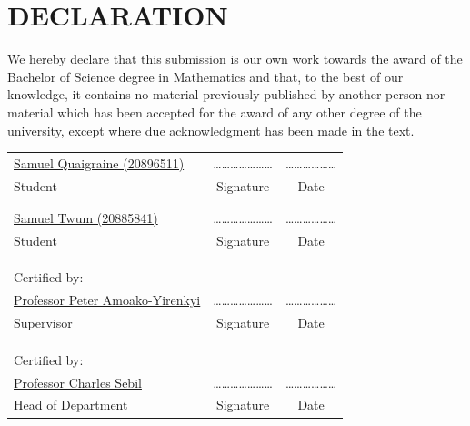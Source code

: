 \chapter*{DECLARATION}

We hereby declare that this submission is our own work towards the award of the Bachelor of Science degree in Mathematics and that, to the best of our knowledge, it contains no material previously published by another person nor material which has been accepted for the award of any other degree of the university, except where due acknowledgment has been made in the text.

\vspace{1.5cm}
\begin{center}
\begin{tabular}{lcc}
\underline{Samuel Quaigraine (20896511)} & \quad\quad\quad \ldots\ldots\ldots\ldots\ldots\ldots\ldots & \quad\quad\quad \ldots\ldots\ldots\ldots\ldots\ldots \\
Student & \quad\quad\quad Signature & \quad\quad\quad Date \\
& & \\
& & \\
\underline{Samuel Twum (20885841)} & \quad\quad\quad \ldots\ldots\ldots\ldots\ldots\ldots\ldots & \quad\quad\quad \ldots\ldots\ldots\ldots\ldots\ldots \\
Student & \quad\quad\quad Signature & \quad\quad\quad Date \\
& & \\
& & \\
& & \\
Certified by: & & \\
\underline{Professor Peter Amoako-Yirenkyi} & \quad\quad\quad \ldots\ldots\ldots\ldots\ldots\ldots\ldots & \quad\quad\quad \ldots\ldots\ldots\ldots\ldots\ldots \\
Supervisor & \quad\quad\quad Signature & \quad\quad\quad Date \\
& & \\
& & \\
& & \\
Certified by: & & \\
\underline{Professor Charles Sebil} & \quad\quad\quad \ldots\ldots\ldots\ldots\ldots\ldots\ldots & \quad\quad\quad \ldots\ldots\ldots\ldots\ldots\ldots \\
Head of Department & \quad\quad\quad Signature & \quad\quad\quad Date
\end{tabular}
\end{center}
